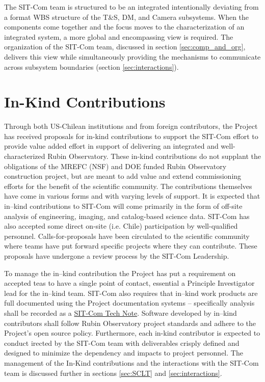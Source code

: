 \documentclass[SE,lsstdraft,authoryear,toc]{lsstdoc}
\begin{document}
The SIT-Com team is structured to be an integrated intentionally deviating from a format WBS structure of the T\&S, DM, and Camera subsystems.  When the components come together and the focus moves to the characterization of an integrated system, a more global and encompassing view is required.  The organization of the SIT-Com team, discussed in section \ref{sec:comp_and_org}, delivers this view while simultaneously providing the mechanisms to communicate across subsystem boundaries (section \ref{sec:interactions}).

\section{In-Kind Contributions}
\label{sec:in_kind}

Through both US-Chilean institutions and from foreign contributors, the Project has received proposals for in-kind contributions to support the SIT-Com effort to provide value added effort in support of delivering an integrated and well-characterized Rubin Observatory.  These in-kind contributions do not supplant the obligations of the MREFC (NSF) and DOE funded Rubin Observatory construction project, but are meant to add value and extend commissioning efforts for the benefit of the scientific community.  The contributions themselves have come in various forms and with varying levels of support.  It is expected that in--kind contributions to SIT-Com will come primarily in the form of off-site analysis of engineering, imaging, and catalog-based science data.  SIT-Com has also accepted some direct on-site (i.e. Chile) participation by well-qualified personnel.  Calls-for-proposals have been circulated to the scientific community where teams have put forward specific projects where they can contribute.  These proposals have undergone a review process by the SIT-Com Leadership.

To manage the in--kind contribution the Project has put a requirement on accepted teas to have a single point of contact, essential a Principle Investigator lead for the in--kind team.  SIT-Com also requires that in--kind work products are full documented using the Project documentation systems -- specifically analysis shall be recorded as a \href{https://www.lsst.io/sitcomtn/?}{SIT-Com Tech Note}.  Software developed by in--kind contributors shall follow Rubin Observatory project standards and adhere to the Project's open source policy.  Furthermore, each in-kind contributor is expected to conduct irected by the SIT-Com team with deliverables crisply defined and designed to minimize the dependency and impacts to project personnel.  The management of the In-Kind contributions and the interactions with the SIT-Com team is discussed further in sections \ref{sec:SCLT} and \ref{sec:interactions}.
\end{document}

